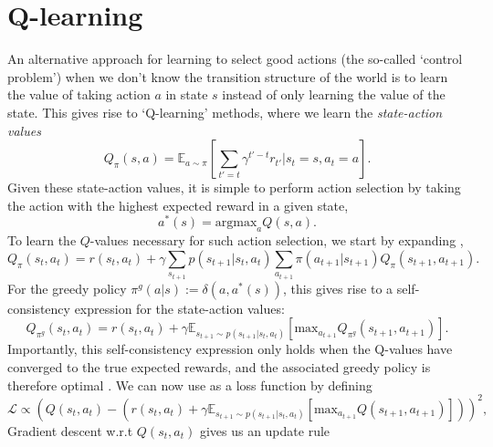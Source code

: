 \section{Q-learning}
\label{sec:q_learning}



An alternative approach for learning to select good actions (the so-called `control problem') when we don't know the transition structure of the world is to learn the value of taking action $a$ in state $s$ instead of only learning the value of the state.
This gives rise to `Q-learning' methods, where we learn the \emph{state-action values}
\begin{equation}
    \label{eq:Q-values}
    Q_\pi(s,a) =  \mathbb{E}_{a \sim \pi} \left [ \sum_{t'=t} \gamma^{t' - t} r_{t'} | s_{t} = s, a_{t} = a \right ].
\end{equation}
Given these state-action values, it is simple to perform action selection by taking the action with the highest expected reward in a given state,
\begin{equation}
    a^*(s) = \text{argmax}_{a} Q(s, a).
\end{equation}
To learn the $Q$-values necessary for such action selection, we start by expanding ,
\begin{equation}
    \label{eq:Q-expanded}
    Q_\pi(s_t,a_t) =  r(s_t, a_t) + \gamma \sum_{s_{t+1}} p(s_{t+1} | s_t, a_t) \sum_{a_{t+1}} \pi(a_{t+1} | s_{t+1}) Q_\pi(s_{t+1}, a_{t+1}).
\end{equation}
For the greedy policy $\pi^g(a|s) := \delta(a, a^*(s))$, this gives rise to a self-consistency expression for the state-action values:
\begin{equation}
    \label{eq:Q-optimal}
    Q_{\pi^g}(s_t,a_t) =  r(s_t, a_t) + \gamma \mathbb{E}_{s_{t+1} \sim p(s_{t+1} | s_t, a_t)} \left [ \text{max}_{a_{t+1}} Q_{\pi^g}(s_{t+1}, a_{t+1}) \right ].
\end{equation}
Importantly, this self-consistency expression only holds when the Q-values have converged to the true expected rewards, and the associated greedy policy is therefore optimal \citep{sutton2018reinforcement}.
We can now use  as a loss function by defining
\begin{equation}
    \mathcal{L} \propto \left (  Q(s_t,a_t) - (r(s_t, a_t) + \gamma \mathbb{E}_{s_{t+1} \sim p(s_{t+1} | s_t, a_t)} \left [ \text{max}_{a_{t+1}} Q(s_{t+1}, a_{t+1}) \right ] ) \right )^2,
\end{equation}
Gradient descent w.r.t $Q(s_t,a_t)$ gives us an update rule
